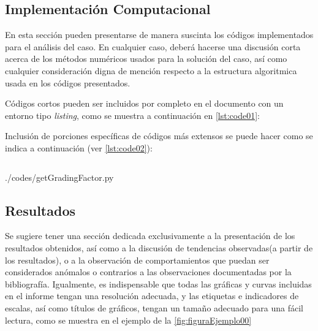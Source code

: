 \documentclass[11pt,stdletter,orderfromtodate,sigleft,twoside]{report}
\begin{document}
\subsection{Implementaci\'on Computacional}
En esta secci\'on pueden presentarse de manera suscinta los c\'odigos
implementados para el an\'alisis del caso. En cualquier caso, deber\'a  hacerse
una discusi\'on corta acerca de los m\'etodos num\'ericos usados para la
soluci\'on del caso, as\'i como  cualquier consideraci\'on digna de menci\'on
respecto a la estructura algoritmica usada en los c\'odigos presentados.

C\'odigos cortos pueden ser incluidos por completo en el documento con un
entorno tipo \emph{listing}, como se muestra a continuaci\'on en \cref{lst:code01}:


Inclusi\'on de porciones espec\'ificas de c\'odigos m\'as extensos se puede
hacer como se indica a continuaci\'on (ver \cref{lst:code02}):

\begin{verbatim}

\end{verbatim}


                {./codes/getGradingFactor.py}
\subsection{Resultados}
Se sugiere tener una secci\'on dedicada exclusivamente a la presentaci\'on de
los resultados obtenidos, as\'i como a la discusi\'on de tendencias
observadas(a partir de los resultados), o a la observaci\'on de comportamientos
que puedan ser considerados an\'omalos o contrarios a las observaciones
documentadas por la bibliograf\'ia.  Igualmente, es indispensable que todas las
gráficas y curvas incluidas en el informe tengan una resolución adecuada, y las
etiquetas e indicadores de escalas, as\'i como t\'itulos de gr\'aficos, tengan
un tama\~no adecuado para una f\'acil lectura, como se muestra en el ejemplo de
la \cref{fig:figuraEjemplo00}
\end{document}
